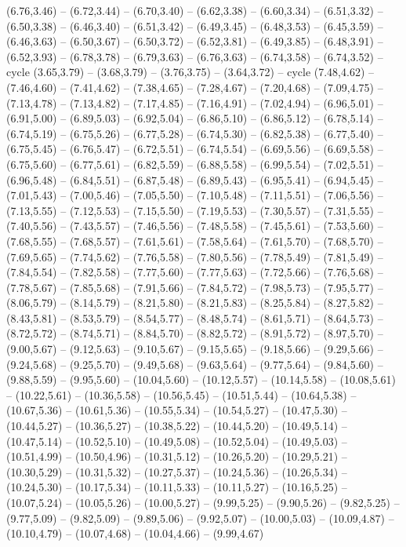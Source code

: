 \expandafter\def\csname geo:gebiet:TCD\endcsname{
  (6.76,3.46) -- (6.72,3.44) -- (6.70,3.40) -- (6.62,3.38) -- (6.60,3.34) -- (6.51,3.32) -- (6.50,3.38) -- (6.46,3.40) -- (6.51,3.42) -- (6.49,3.45) -- (6.48,3.53) -- (6.45,3.59) -- (6.46,3.63) -- (6.50,3.67) -- (6.50,3.72) -- (6.52,3.81) -- (6.49,3.85) -- (6.48,3.91) -- (6.52,3.93) -- (6.78,3.78) -- (6.79,3.63) -- (6.76,3.63) -- (6.74,3.58) -- (6.74,3.52) -- cycle}
\expandafter\def\csname geo:gebiet:HTI\endcsname{
  }
\expandafter\def\csname geo:gebiet:DOM\endcsname{
  (3.65,3.79) -- (3.68,3.79) -- (3.76,3.75) -- (3.64,3.72) -- cycle}
\expandafter\def\csname geo:gebiet:RUS\endcsname{
  (7.48,4.62) -- (7.46,4.60) -- (7.41,4.62) -- (7.38,4.65) -- (7.28,4.67) -- (7.20,4.68) -- (7.09,4.75) -- (7.13,4.78) -- (7.13,4.82) -- (7.17,4.85) -- (7.16,4.91) -- (7.02,4.94) -- (6.96,5.01) -- (6.91,5.00) -- (6.89,5.03) -- (6.92,5.04) -- (6.86,5.10) -- (6.86,5.12) -- (6.78,5.14) -- (6.74,5.19) -- (6.75,5.26) -- (6.77,5.28) -- (6.74,5.30) -- (6.82,5.38) -- (6.77,5.40) -- (6.75,5.45) -- (6.76,5.47) -- (6.72,5.51) -- (6.74,5.54) -- (6.69,5.56) -- (6.69,5.58) -- (6.75,5.60) -- (6.77,5.61) -- (6.82,5.59) -- (6.88,5.58) -- (6.99,5.54) -- (7.02,5.51) -- (6.96,5.48) -- (6.84,5.51) -- (6.87,5.48) -- (6.89,5.43) -- (6.95,5.41) -- (6.94,5.45) -- (7.01,5.43) -- (7.00,5.46) -- (7.05,5.50) -- (7.10,5.48) -- (7.11,5.51) -- (7.06,5.56) -- (7.13,5.55) -- (7.12,5.53) -- (7.15,5.50) -- (7.19,5.53) -- (7.30,5.57) -- (7.31,5.55) -- (7.40,5.56) -- (7.43,5.57) -- (7.46,5.56) -- (7.48,5.58) -- (7.45,5.61) -- (7.53,5.60) -- (7.68,5.55) -- (7.68,5.57) -- (7.61,5.61) -- (7.58,5.64) -- (7.61,5.70) -- (7.68,5.70) -- (7.69,5.65) -- (7.74,5.62) -- (7.76,5.58) -- (7.80,5.56) -- (7.78,5.49) -- (7.81,5.49) -- (7.84,5.54) -- (7.82,5.58) -- (7.77,5.60) -- (7.77,5.63) -- (7.72,5.66) -- (7.76,5.68) -- (7.78,5.67) -- (7.85,5.68) -- (7.91,5.66) -- (7.84,5.72) -- (7.98,5.73) -- (7.95,5.77) -- (8.06,5.79) -- (8.14,5.79) -- (8.21,5.80) -- (8.21,5.83) -- (8.25,5.84) -- (8.27,5.82) -- (8.43,5.81) -- (8.53,5.79) -- (8.54,5.77) -- (8.48,5.74) -- (8.61,5.71) -- (8.64,5.73) -- (8.72,5.72) -- (8.74,5.71) -- (8.84,5.70) -- (8.82,5.72) -- (8.91,5.72) -- (8.97,5.70) -- (9.00,5.67) -- (9.12,5.63) -- (9.10,5.67) -- (9.15,5.65) -- (9.18,5.66) -- (9.29,5.66) -- (9.24,5.68) -- (9.25,5.70) -- (9.49,5.68) -- (9.63,5.64) -- (9.77,5.64) -- (9.84,5.60) -- (9.88,5.59) -- (9.95,5.60) -- (10.04,5.60) -- (10.12,5.57) -- (10.14,5.58) -- (10.08,5.61) -- (10.22,5.61) -- (10.36,5.58) -- (10.56,5.45) -- (10.51,5.44) -- (10.64,5.38) -- (10.67,5.36) -- (10.61,5.36) -- (10.55,5.34) -- (10.54,5.27) -- (10.47,5.30) -- (10.44,5.27) -- (10.36,5.27) -- (10.38,5.22) -- (10.44,5.20) -- (10.49,5.14) -- (10.47,5.14) -- (10.52,5.10) -- (10.49,5.08) -- (10.52,5.04) -- (10.49,5.03) -- (10.51,4.99) -- (10.50,4.96) -- (10.31,5.12) -- (10.26,5.20) -- (10.29,5.21) -- (10.30,5.29) -- (10.31,5.32) -- (10.27,5.37) -- (10.24,5.36) -- (10.26,5.34) -- (10.24,5.30) -- (10.17,5.34) -- (10.11,5.33) -- (10.11,5.27) -- (10.16,5.25) -- (10.07,5.24) -- (10.05,5.26) -- (10.00,5.27) -- (9.99,5.25) -- (9.90,5.26) -- (9.82,5.25) -- (9.77,5.09) -- (9.82,5.09) -- (9.89,5.06) -- (9.92,5.07) -- (10.00,5.03) -- (10.09,4.87) -- (10.10,4.79) -- (10.07,4.68) -- (10.04,4.66) -- (9.99,4.67) }
